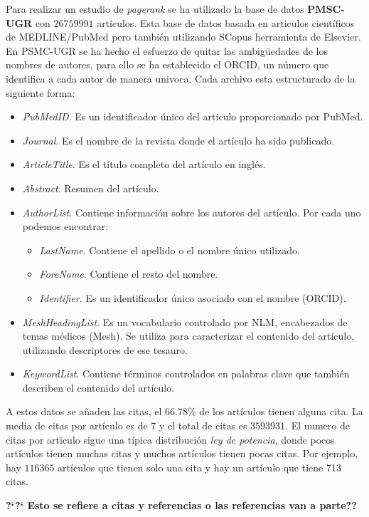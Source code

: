 \documentclass[size=a4, parskip=half, titlepage=false, toc=flat, toc=bib, 12pt]{scrartcl}
\theoremstyle{theorem-style}
\theoremstyle{definition-style}
\theoremstyle{remark-style}
\theoremstyle{example-style}
\theoremstyle{definition-style}
\theoremstyle{remark-style}
\begin{document}
Para realizar un estudio de \textit{pagerank} se ha utilizado la base de datos \textbf{PMSC-UGR} con
$26759991$ artículos. Esta base de datos basada en articulos científicos de MEDLINE/PubMed  pero
también utilizando SCopus herramienta de Elsevier. En PSMC-UGR se ha hecho el esfuerzo de
quitar las ambigüedades de los nombres de autores, para ello se ha establecido el ORCID, un número
que identifica a cada autor de manera univoca. Cada archivo esta estructurado de la siguiente forma:
\begin{itemize}
\item \textit{PubMedID}. Es un identificador único del articulo proporcionado por PubMed.
\item \textit{Journal}. Es el nombre de la revista donde el artículo ha sido publicado.
\item \textit{ArticleTitle}. Es el título completo del artículo en inglés.
\item \textit{Abstract}. Resumen del artículo.
\item \textit{AuthorList}. Contiene información sobre los autores del artículo. Por cada uno podemos encontrar:
\begin{itemize}
\item \textit{LastName}. Contiene el apellido o el nombre único utilizado.
\item \textit{ForeName}. Contiene el resto del nombre.
\item \textit{Identifier}. Es un identificador único asociado con el nombre (ORCID).
\end{itemize}
\item \textit{MeshHeadingList}. Es un vocabulario controlado por NLM, encabezados de temas médicos (Mesh). Se utiliza para caracterizar el contenido del artículo, utilizando descriptores de ese tesauro.
\item \textit{KeywordList}. Contiene términos controlados en palabras clave que también describen el contenido del artículo.
\end{itemize}

A estos datos se añaden las citas, el $66.78 \%$ de los artículos tienen alguna cita. La media de citas por artículo es de 7 y el total de citas es $3593931$. El numero de citas por articulo sigue una típica distribución \textit{ley de potencia}, donde pocos artículos tienen muchas citas y muchos artículos tienen pocas citas. Por ejemplo, hay $116365$ artículos que tienen solo una cita y hay un artículo que tiene 713 citas.

\textbf{?`?` Esto se refiere a citas y referencias o las referencias van a parte??}
\end{document}
